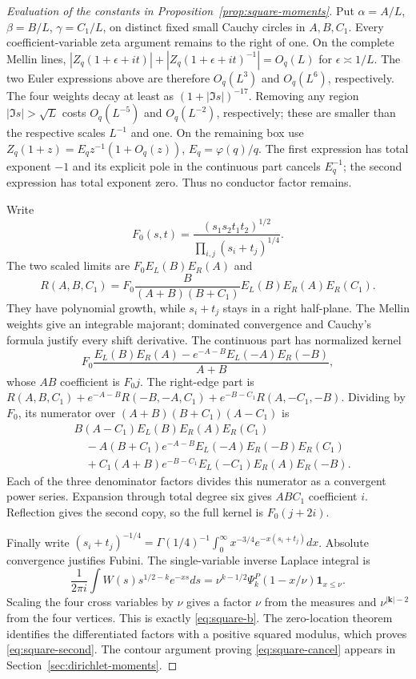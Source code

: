 \begin{proof}[Evaluation of the constants in Proposition~\ref{prop:square-moments}]
Put $\alpha=A/L$, $\beta=B/L$, $\gamma=C_1/L$, on distinct fixed
small Cauchy circles in $A,B,C_1$. Every coefficient-variable zeta
argument remains to the right of one. On the complete Mellin lines,
$|Z_q(1+\epsilon+it)|+|Z_q(1+\epsilon+it)^{-1}|=O_q(L)$ for
$\epsilon\asymp1/L$. The two Euler expressions above are therefore
$O_q(L^3)$ and $O_q(L^6)$, respectively. The four weights decay at
least as $(1+|\Im s|)^{-17}$. Removing any region
$|\Im s|>\sqrt L$ costs $O_q(L^{-5})$ and $O_q(L^{-2})$, respectively;
these are smaller than the respective scales $L^{-1}$ and one.
On the remaining box use
$Z_q(1+z)=E_qz^{-1}(1+O_q(z))$, $E_q=\varphi(q)/q$.
The first expression has total exponent $-1$ and its explicit pole
in the continuous part cancels $E_q^{-1}$; the second expression has
total exponent zero. Thus no conductor factor remains.

Write
\[
 F_0(s,t)=\frac{(s_1s_2t_1t_2)^{1/2}}
                    {\prod_{i,j}(s_i+t_j)^{1/4}}.
\]
The two scaled limits are $F_0E_L(B)E_R(A)$ and
\[
 R(A,B,C_1)=F_0\frac{B}{(A+B)(B+C_1)}E_L(B)E_R(A)E_R(C_1).
\]
They have polynomial growth, while $s_i+t_j$ stays in a right
half-plane. The Mellin weights give an integrable majorant;
dominated convergence and Cauchy's formula justify every shift
derivative. The continuous part has normalized kernel
\[
 F_0\frac{E_L(B)E_R(A)-e^{-A-B}E_L(-A)E_R(-B)}{A+B},
\]
whose $AB$ coefficient is $F_0j$. The right-edge part is
$R(A,B,C_1)+e^{-A-B}R(-B,-A,C_1)+e^{-B-C_1}R(A,-C_1,-B)$.
Dividing by $F_0$, its numerator over
$(A+B)(B+C_1)(A-C_1)$ is
\begin{align*}
 &B(A-C_1)E_L(B)E_R(A)E_R(C_1)\\
 &\quad-A(B+C_1)e^{-A-B}E_L(-A)E_R(-B)E_R(C_1)\\
 &\quad+C_1(A+B)e^{-B-C_1}E_L(-C_1)E_R(A)E_R(-B).
\end{align*}
Each of the three denominator factors divides this numerator as a
convergent power series. Expansion through total degree six gives
$ABC_1$ coefficient $i$. Reflection gives the second copy, so the
full kernel is $F_0(j+2i)$.

Finally write
$(s_i+t_j)^{-1/4}=\Gamma(1/4)^{-1}\int_0^\infty
 x^{-3/4}e^{-x(s_i+t_j)}dx$. Absolute convergence justifies Fubini.
The single-variable inverse Laplace integral is
\[
 \frac1{2\pi i}\int W(s)s^{1/2-k}e^{-xs}ds
 =\nu^{k-1/2}\Psi_k^P(1-x/\nu)\mathbf1_{x\le\nu}.
\]
Scaling the four cross variables by $\nu$ gives a factor $\nu$ from
the measures and $\nu^{|\mathbf k|-2}$ from the four vertices.
This is exactly \eqref{eq:square-b}. The zero-location theorem
identifies the differentiated factors with a positive squared modulus,
which proves \eqref{eq:square-second}. The contour argument proving
\eqref{eq:square-cancel} appears in Section~\ref{sec:dirichlet-moments}.
\end{proof}

